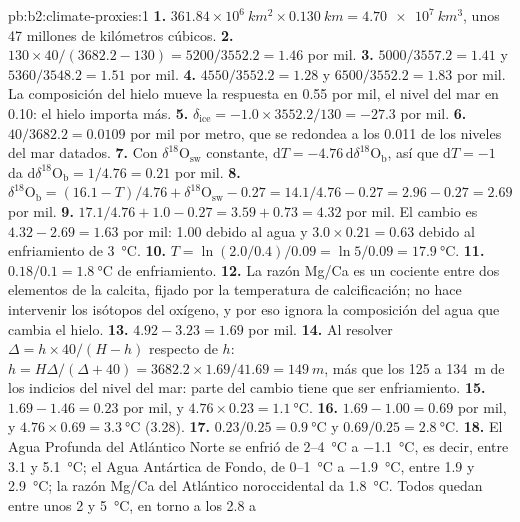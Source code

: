 \begin{solution}{pb:b2:climate-proxies:1}
\textbf{1.} $361.84 \times 10^6\ \unit{km^2} \times \qty{0.130}{km} = \qty{4.70e7}{km^3}$, unos 47
millones de kilómetros cúbicos.
\textbf{2.} $130 \times 40/(3682.2 - 130) = 5200/3552.2 = 1.46$ por mil.
\textbf{3.} $5000/3557.2 = 1.41$ y $5360/3548.2 = 1.51$ por mil.
\textbf{4.} $4550/3552.2 = 1.28$ y $6500/3552.2 = 1.83$ por mil. La composición del hielo
mueve la respuesta en \num{0.55} por mil, el nivel del mar en \num{0.10}: el hielo importa más.
\textbf{5.} $\delta_{\mathrm{ice}} = -1.0 \times 3552.2/130 = -27.3$ por mil.
\textbf{6.} $40/3682.2 = 0.0109$ por mil por metro, que se redondea a los \num{0.011} de los niveles
del mar datados.
\textbf{7.} Con $\delta^{18}\mathrm{O}_{\mathrm{sw}}$ constante, $\mathrm{d}T = -4.76\,\mathrm{d}\delta^{18}
\mathrm{O}_{\mathrm{b}}$, así que $\mathrm{d}T = -1$ da $\mathrm{d}\delta^{18}\mathrm{O}_{\mathrm{b}} =
1/4.76 = 0.21$ por mil.
\textbf{8.} $\delta^{18}\mathrm{O}_{\mathrm{b}} = (16.1 - T)/4.76 + \delta^{18}\mathrm{O}_{\mathrm{sw}}
- 0.27 = 14.1/4.76 - 0.27 = 2.96 - 0.27 = 2.69$ por mil.
\textbf{9.} $17.1/4.76 + 1.0 - 0.27 = 3.59 + 0.73 = 4.32$ por mil. El cambio es $4.32 - 2.69 =
1.63$ por mil: \num{1.00} debido al agua y $3.0 \times 0.21 = 0.63$ debido al enfriamiento de
\qty{3}{\celsius}.
\textbf{10.} $T = \ln(2.0/0.4)/0.09 = \ln 5/0.09 = \qty{17.9}{\celsius}$.
\textbf{11.} $0.18/0.1 = \qty{1.8}{\celsius}$ de enfriamiento.
\textbf{12.} La razón Mg/Ca es un cociente entre dos elementos de la calcita, fijado por la temperatura de
calcificación; no hace intervenir los isótopos del oxígeno, y por eso ignora la composición del
agua que cambia el hielo.
\textbf{13.} $4.92 - 3.23 = 1.69$ por mil.
\textbf{14.} Al resolver $\Delta = h \times 40/(H - h)$ respecto de $h$: $h = H\Delta/(\Delta + 40) = 3682.2
\times 1.69/41.69 = \qty{149}{m}$, más que los 125 a \qty{134}{m} de los indicios del nivel del mar:
parte del cambio tiene que ser enfriamiento.
\textbf{15.} $1.69 - 1.46 = 0.23$ por mil, y $4.76 \times 0.23 = \qty{1.1}{\celsius}$.
\textbf{16.} $1.69 - 1.00 = 0.69$ por mil, y $4.76 \times 0.69 = \qty{3.3}{\celsius}$ (3.28).
\textbf{17.} $0.23/0.25 = \qty{0.9}{\celsius}$ y $0.69/0.25 = \qty{2.8}{\celsius}$.
\textbf{18.} El Agua Profunda del Atlántico Norte se enfrió de 2--\qty{4}{\celsius} a \qty{-1.1}{\celsius},
es decir, entre 3.1 y \qty{5.1}{\celsius}; el Agua Antártica de Fondo, de 0--\qty{1}{\celsius} a
\qty{-1.9}{\celsius}, entre 1.9 y \qty{2.9}{\celsius}; la razón Mg/Ca del Atlántico noroccidental da
\qty{1.8}{\celsius}. Todos quedan entre unos 2 y \qty{5}{\celsius}, en torno a los 2.8 a

\end{solution}
